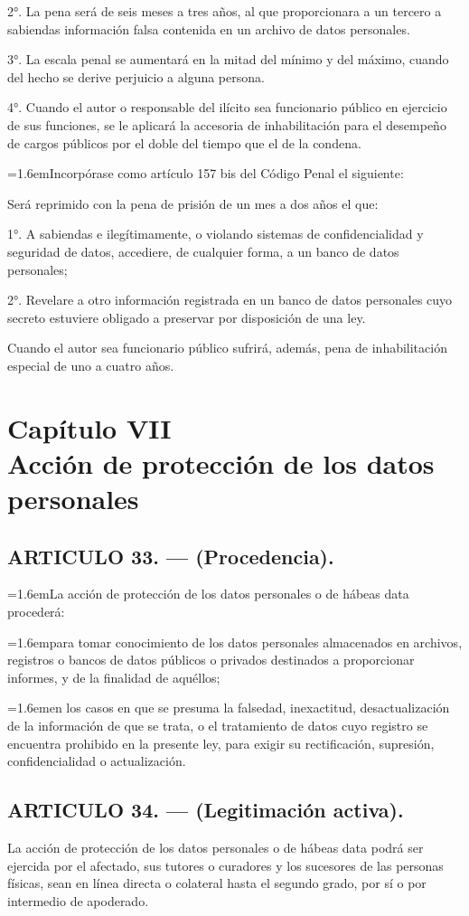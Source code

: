 \documentclass[10pt,a4paper]{article}
\newcommand{\capitulo}[2]{\section[#1 --- #2]{#1\\[2pt]#2}}
\newcommand{\articulo}[1]{\subsection{#1}}
\newcommand{\inciso}[2]{\par{\hangindent=1.6em\hangafter=1\makebox[1.6em][l]{#1}#2\par}}
\begin{document}
2°. La pena será de seis meses a tres años, al que proporcionara a un tercero a sabiendas información falsa contenida en un archivo de datos personales.

3°. La escala penal se aumentará en la mitad del mínimo y del máximo, cuando del hecho se derive perjuicio a alguna persona.

4°. Cuando el autor o responsable del ilícito sea funcionario público en ejercicio de sus funciones, se le aplicará la accesoria de inhabilitación para el desempeño de cargos públicos por el doble del tiempo que el de la condena\textquotesingle{}.

\inciso{2.}{Incorpórase como artículo 157 bis del Código Penal el siguiente:}

\textquotesingle{}Será reprimido con la pena de prisión de un mes a dos años el que:

1°. A sabiendas e ilegítimamente, o violando sistemas de confidencialidad y seguridad de datos, accediere, de cualquier forma, a un banco de datos personales;

2°. Revelare a otro información registrada en un banco de datos personales cuyo secreto estuviere obligado a preservar por disposición de una ley.

Cuando el autor sea funcionario público sufrirá, además, pena de inhabilitación especial de uno a cuatro años\textquotesingle{}.

\capitulo{Capítulo VII}{Acción de protección de los datos personales}
\articulo{ARTICULO 33. — (Procedencia).}
\inciso{1.}{La acción de protección de los datos personales o de hábeas data procederá:}

\inciso{a)}{para tomar conocimiento de los datos personales almacenados en archivos, registros o bancos de datos públicos o privados destinados a proporcionar informes, y de la finalidad de aquéllos;}

\inciso{b)}{en los casos en que se presuma la falsedad, inexactitud, desactualización de la información de que se trata, o el tratamiento de datos cuyo registro se encuentra prohibido en la presente ley, para exigir su rectificación, supresión, confidencialidad o actualización.}

\articulo{ARTICULO 34. — (Legitimación activa).}
La acción de protección de los datos personales o de hábeas data podrá ser ejercida por el afectado, sus tutores o curadores y los sucesores de las personas físicas, sean en línea directa o colateral hasta el segundo grado, por sí o por intermedio de apoderado.
\end{document}
